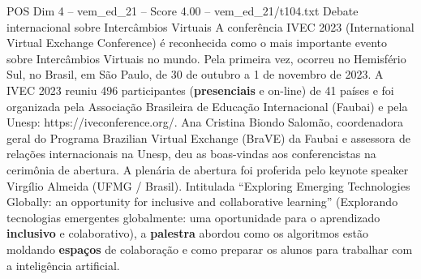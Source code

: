 \begin{textsample}{POS Dim 4 – vem\_ed\_21 – Score 4.00 – vem\_ed\_21/t104.txt}  \label{ex:f4_pos_097}
Debate internacional sobre Intercâmbios Virtuais A conferência IVEC 2023 (International Virtual Exchange Conference) é reconhecida como o mais importante evento sobre Intercâmbios Virtuais no mundo.
Pela primeira vez, ocorreu no Hemisfério Sul, no Brasil, em São Paulo, de 30 de outubro a 1 de novembro de 2023.
A IVEC 2023 reuniu 496 participantes (\textbf{presenciais} e on-line) de 41 países e foi organizada pela Associação Brasileira de Educação Internacional (Faubai) e pela Unesp: https://iveconference.org/.
Ana Cristina Biondo Salomão, coordenadora geral do Programa Brazilian Virtual Exchange (BraVE) da Faubai e assessora de relações internacionais na Unesp, deu as boas-vindas aos conferencistas na cerimônia de abertura.
A plenária de abertura foi proferida pelo keynote speaker Virgílio Almeida (UFMG / Brasil).
Intitulada “Exploring Emerging Technologies Globally: an opportunity for inclusive and collaborative learning” (Explorando tecnologias emergentes globalmente: uma oportunidade para o aprendizado \textbf{inclusivo} e colaborativo), a \textbf{palestra} abordou como os algoritmos estão moldando \textbf{espaços} de colaboração e como preparar os alunos para trabalhar com a inteligência artificial.

\end{textsample}
